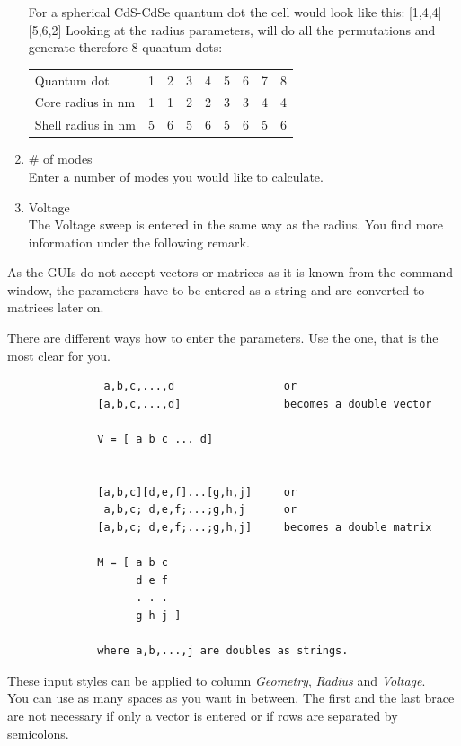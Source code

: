 \begin{enumerate}
							\begin{EXAMPLE}
								For a spherical CdS-CdSe quantum dot the cell would look like this: [1,4,4][5,6,2]
								Looking at the radius parameters, \software will do all the permutations and generate therefore 8 quantum dots: \\
								\newline
								\begin{tabular}{@{}lcccccccc}
									Quantum dot					&	1	&	2	&	3	&	4 &	5	&	6	& 7	&	8	\\
									Core radius	in nm		&	1	& 1 & 2 & 2 & 3	& 3 & 4 & 4	\\
									Shell radius in nm	& 5	& 6 & 5 & 6 & 5 & 6 & 5 & 6	\\
								\end{tabular}
							\end{EXAMPLE}
				\item \# of modes	\\
							Enter a number of modes you would like to calculate.
				\item Voltage			\\
							The Voltage sweep is entered in the same way as the radius. You find more information under the following remark.
			\end{enumerate}
			
			\begin{REMARK} 
				As the \matlab \gls{GUI}s do not accept vectors or matrices as it is known from the command window, the parameters
				have to be entered as a string and are converted to matrices later on.
				
				There are different ways how to enter the parameters. Use the one, that is the most clear for you.
				\begin{verbatim}
               a,b,c,...,d                 or
              [a,b,c,...,d]                becomes a double vector

              V = [ a b c ... d]


              [a,b,c][d,e,f]...[g,h,j]     or
               a,b,c; d,e,f;...;g,h,j      or
              [a,b,c; d,e,f;...;g,h,j]     becomes a double matrix

              M = [ a b c
                    d e f
                    . . .
                    g h j ]

              where a,b,...,j are doubles as strings.
   			\end{verbatim}
   			These input styles can be applied to column {\it Geometry}, {\it Radius} and {\it Voltage}.	\\
   			You can use as many spaces as you want in between. The first and the last brace are not necessary if only a vector is entered or if
   			rows are separated by semicolons.
			\end{REMARK}
			

